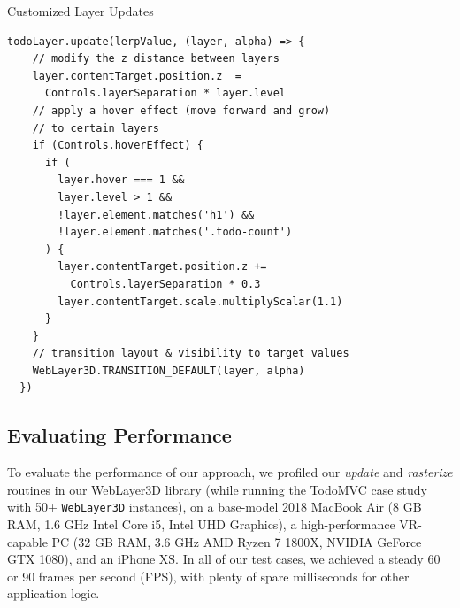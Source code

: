 \documentclass[sigconf]{acmart}
\begin{document}
\begin{listing}[H]
\caption{Customized Layer Updates}
\label{listing:modifylayout}
\begin{verbatim}
todoLayer.update(lerpValue, (layer, alpha) => {
    // modify the z distance between layers
    layer.contentTarget.position.z  = 
      Controls.layerSeparation * layer.level
    // apply a hover effect (move forward and grow)
    // to certain layers
    if (Controls.hoverEffect) {
      if (
        layer.hover === 1 &&
        layer.level > 1 &&
        !layer.element.matches('h1') &&
        !layer.element.matches('.todo-count')
      ) {
        layer.contentTarget.position.z += 
          Controls.layerSeparation * 0.3
        layer.contentTarget.scale.multiplyScalar(1.1)
      }
    }
    // transition layout & visibility to target values
    WebLayer3D.TRANSITION_DEFAULT(layer, alpha)
  })
\end{verbatim}
\end{listing}




\subsection{Evaluating Performance}
To evaluate the performance of our approach, we profiled our \textit{update} and \textit{rasterize} routines in our WebLayer3D library (while running the TodoMVC case study with 50+ \verb|WebLayer3D| instances), on a base-model 2018 MacBook Air (8 GB RAM, 1.6 GHz Intel Core i5, Intel UHD Graphics), a high-performance VR-capable PC (32 GB RAM, 3.6 GHz AMD Ryzen 7 1800X, NVIDIA GeForce GTX 1080), and an iPhone XS. In all of our test cases, we achieved a steady 60 or 90 frames per second (FPS), with plenty of spare milliseconds for other application logic. 
\end{document}
